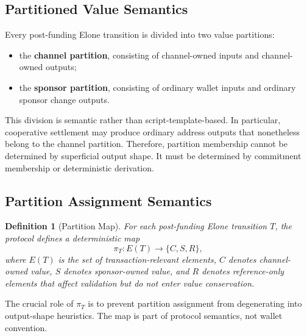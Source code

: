 \documentclass[11pt,a4paper]{article}
\newtheorem{definition}[theorem]{Definition}
\begin{document}
\subsection{Partitioned Value Semantics}

Every post-funding Elone transition is divided into two value partitions:
\begin{itemize}
    \item the \textbf{channel partition}, consisting of channel-owned inputs and channel-owned outputs;
    \item the \textbf{sponsor partition}, consisting of ordinary wallet inputs and ordinary sponsor change outputs.
\end{itemize}

This division is semantic rather than script-template-based. In particular, cooperative settlement may produce ordinary address outputs that nonetheless belong to the channel partition. Therefore, partition membership cannot be determined by superficial output shape. It must be determined by commitment membership or deterministic derivation.

\subsection{Partition Assignment Semantics}

\begin{definition}[Partition Map]
For each post-funding Elone transition $T$, the protocol defines a deterministic map
\[
\pi_T : E(T) \rightarrow \{C, S, R\},
\]
where $E(T)$ is the set of transaction-relevant elements, $C$ denotes channel-owned value, $S$ denotes sponsor-owned value, and $R$ denotes reference-only elements that affect validation but do not enter value conservation.
\end{definition}

The crucial role of $\pi_T$ is to prevent partition assignment from degenerating into output-shape heuristics. The map is part of protocol semantics, not wallet convention.
\end{document}
